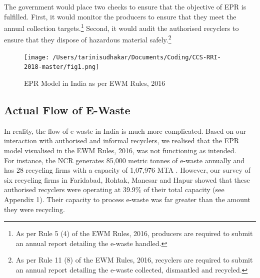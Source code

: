 \documentclass[a4paper, 12pt]{article}
\begin{document}
                    The government would place two checks to ensure that the objective of EPR is fulfilled. First, it would monitor the producers to ensure that they meet the annual collection targets.\footnote{As per Rule 5 (4) of the EWM Rules, 2016, producers are required to submit an annual report detailing the e-waste handled.} Second, it would audit the authorised recyclers to ensure that they dispose of hazardous material safely.\footnote{As per Rule 11 (8) of the EWM Rules, 2016, recyclers are required to submit an annual report detailing the e-waste collected, dismantled and recycled.}\\
                    
                    \begin{figure}[H]
                    	\centering
                    	\texttt{[image: /Users/tarinisudhakar/Documents/Coding/CCS-RRI-2018-master/fig1.png]}
                    	\caption[Optional Caption]{EPR Model in India as per EWM Rules, 2016}
                    \end{figure}
                    
                    \subsection{Actual Flow of E-Waste}
                    
                    In reality, the flow of e-waste in India is much more complicated. Based on our interaction with authorised and informal recyclers, we realised that the EPR model visualised in the EWM Rules, 2016, was not functioning as intended.\\ 
                    
                    For instance, the NCR generates 85,000 metric tonnes of e-waste annually and has 28 recycling firms with a capacity of 1,07,976 MTA \parencite{assochamdelhi, cpcbrecyclersreport}. However, our survey of six recycling firms in Faridabad, Rohtak, Manesar and Hapur showed that these authorised recyclers were operating at 39.9\% of their total capacity (see Appendix 1). Their capacity to process e-waste was far greater than the amount they were recycling. \\
                    
\end{document}
